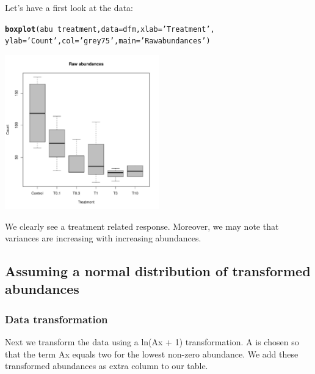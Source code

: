 \documentclass{scrartcl}\usepackage[]{graphicx}\usepackage[]{color}
\makeatletter
\newcommand{\hlstr}[1]{\textcolor[rgb]{0.192,0.494,0.8}{#1}}%
\newcommand{\hlopt}[1]{\textcolor[rgb]{0,0,0}{#1}}%
\newcommand{\hlstd}[1]{\textcolor[rgb]{0.345,0.345,0.345}{#1}}%
\newcommand{\hlkwc}[1]{\textcolor[rgb]{0.333,0.667,0.333}{#1}}%
\newcommand{\hlkwd}[1]{\textcolor[rgb]{0.737,0.353,0.396}{\textbf{#1}}}%
\newenvironment{kframe}{%
 \def\at@end@of@kframe{}%
 \ifinner\ifhmode%
  \def\at@end@of@kframe{\end{minipage}}%
  \begin{minipage}{\columnwidth}%
 \fi\fi%
 \def\FrameCommand##1{\hskip\@totalleftmargin \hskip-\fboxsep
 \colorbox{shadecolor}{##1}\hskip-\fboxsep
     \hskip-\linewidth \hskip-\@totalleftmargin \hskip\columnwidth}%
 \MakeFramed {\advance\hsize-\width
   \@totalleftmargin\z@ \linewidth\hsize
   \@setminipage}}%
 {\par\unskip\endMakeFramed%
 \at@end@of@kframe}
\newenvironment{knitrout}{}{} %
\renewenvironment{knitrout}{\begin{spacing}{1}}{\end{spacing}}
\makeatother
\begin{document}
  
Let's have a first look at the data:
\begin{knitrout}
\color{fgcolor}\begin{kframe}
\begin{alltt}
\hlkwd{boxplot}\hlstd{(abu} \hlopt{~} \hlstd{treatment,} \hlkwc{data} \hlstd{= dfm,} \hlkwc{xlab} \hlstd{=} \hlstr{'Treatment'}\hlstd{,}
        \hlkwc{ylab} \hlstd{=} \hlstr{'Count'}\hlstd{,} \hlkwc{col} \hlstd{=} \hlstr{'grey75'}\hlstd{,} \hlkwc{main} \hlstd{=} \hlstr{'Raw abundances'}\hlstd{)}
\end{alltt}
\end{kframe}

{\centering \includegraphics[width=0.5\textwidth]{figure/count_raw_plot-1} 

}



\end{knitrout}
We clearly see a treatment related response. 
Moreover, we may note that variances are increasing with increasing abundances.



\subsection{Assuming a normal distribution of transformed abundances}
\subsubsection{Data transformation}
Next we transform the data using a ln(Ax + 1) transformation.
A is chosen so that the term Ax equals two for the lowest non-zero abundance.
We add these transformed abundances as extra column to our table.
\end{document}
